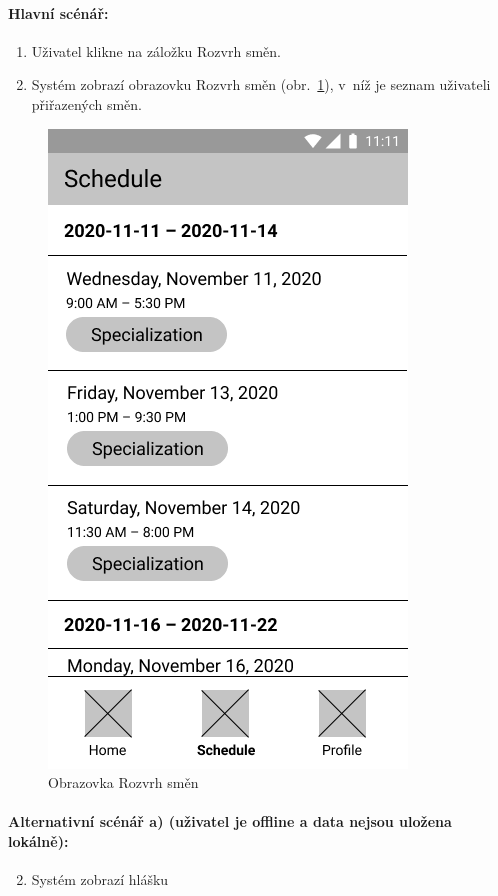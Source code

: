 \documentclass[twoside]{ctuthesis}
\begin{document}
\paragraph{Hlavní scénář:}
\begin{enumerate}
	\item Uživatel klikne na záložku Rozvrh směn.
	\item Systém zobrazí obrazovku Rozvrh směn (obr.~\ref{fig:schedule}), v~níž je seznam uživateli přiřazených směn.
\end{enumerate}

\begin{figure}[h]
	\includegraphics[scale=.35]{img/main-schedule.png}
	\caption{Obrazovka Rozvrh směn}
	\label{fig:schedule}
\end{figure}

\paragraph{Alternativní scénář a) (uživatel je offline a data nejsou uložena lokálně):}
\begin{enumerate}[label=\arabic*a]
	\setcounter{enumi}{1}
	\item Systém zobrazí hlášku 
\end{enumerate}
\end{document}
